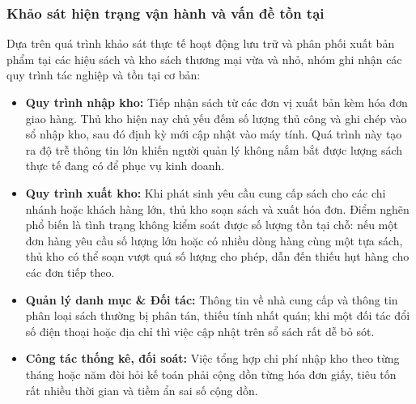 \documentclass[12pt,a4paper]{article}
\begin{document}
\subsubsection{Khảo sát hiện trạng vận hành và vấn đề tồn tại}
Dựa trên quá trình khảo sát thực tế hoạt động lưu trữ và phân phối xuất bản phẩm tại các hiệu sách và kho sách thương mại vừa và nhỏ, nhóm ghi nhận các quy trình tác nghiệp và tồn tại cơ bản:
\begin{itemize}
    \item \textbf{Quy trình nhập kho:} Tiếp nhận sách từ các đơn vị xuất bản kèm hóa đơn giao hàng. Thủ kho hiện nay chủ yếu đếm số lượng thủ công và ghi chép vào sổ nhập kho, sau đó định kỳ mới cập nhật vào máy tính. Quá trình này tạo ra độ trễ thông tin lớn khiến người quản lý không nắm bắt được lượng sách thực tế đang có để phục vụ kinh doanh.
    \item \textbf{Quy trình xuất kho:} Khi phát sinh yêu cầu cung cấp sách cho các chi nhánh hoặc khách hàng lớn, thủ kho soạn sách và xuất hóa đơn. Điểm nghẽn phổ biến là tình trạng không kiểm soát được số lượng tồn tại chỗ: nếu một đơn hàng yêu cầu số lượng lớn hoặc có nhiều dòng hàng cùng một tựa sách, thủ kho có thể soạn vượt quá số lượng cho phép, dẫn đến thiếu hụt hàng cho các đơn tiếp theo.
    \item \textbf{Quản lý danh mục \& Đối tác:} Thông tin về nhà cung cấp và thông tin phân loại sách thường bị phân tán, thiếu tính nhất quán; khi một đối tác đổi số điện thoại hoặc địa chỉ thì việc cập nhật trên sổ sách rất dễ bỏ sót.
    \item \textbf{Công tác thống kê, đối soát:} Việc tổng hợp chi phí nhập kho theo từng tháng hoặc năm đòi hỏi kế toán phải cộng dồn từng hóa đơn giấy, tiêu tốn rất nhiều thời gian và tiềm ẩn sai số cộng dồn.
\end{itemize}
\end{document}
